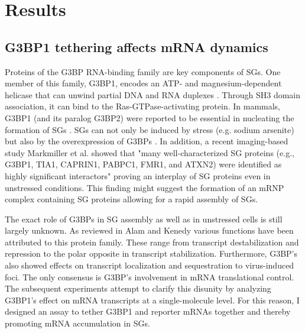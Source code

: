 \chapter{Results}


\section{G3BP1 tethering affects mRNA dynamics}

Proteins of the G3BP RNA-binding family are key components of SGs.
One member of this family, G3BP1, encodes an ATP- and magnesium-dependent helicase that can unwind partial DNA and RNA duplexes \cite{costa_human_1999}.
Through SH3 domain association, it can bind to the Ras-GTPase-activating protein.
In mammals, G3BP1 (and its paralog G3BP2) were reported to be essential in nucleating the formation of SGs \cite{kedersha_g3bp-caprin1-usp10_2016}.
SGs can not only be induced by stress (e.g. sodium arsenite) but also by the overexpression of G3BPs \cite{tourriere_rasgap-associated_2003}.
In addition, a recent imaging-based study Markmiller et al. \cite{markmiller_context-dependent_2018} showed that "many well-characterized SG proteins (e.g., G3BP1, TIA1, CAPRIN1, PABPC1, FMR1, and ATXN2) were identified as highly significant interactors" proving an interplay of SG proteins even in unstressed conditions.
This finding might suggest the formation of an mRNP complex containing SG proteins allowing for a rapid assembly of SGs.

The exact role of G3BPs in SG assembly as well as in unstressed cells is still largely unknown.
As reviewed in Alam and Kenedy \cite{alam_rasputin_2019} various functions have been attributed to this protein family.
These range from transcript destabilization and repression to the polar opposite in transcript stabilization.
Furthermore, G3BP's also showed effects on transcript localization and sequestration to virus-induced foci.
The only consensus is G3BP's involvement in mRNA translational control.
The subsequent experiments attempt to clarify this disunity by analyzing G3BP1's effect on mRNA transcripts at a single-molecule level.
For this reason, I designed an assay to tether G3BP1 and reporter mRNAs together and thereby promoting mRNA accumulation in SGs.

